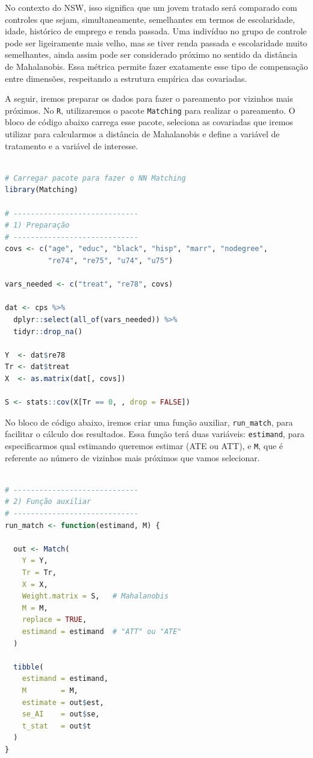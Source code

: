 No contexto do NSW, isso significa que um jovem tratado será comparado com controles que sejam, simultaneamente, semelhantes em termos de escolaridade, idade, histórico de emprego e renda passada. Uma indivíduo no grupo de controle pode ser ligeiramente mais velho, mas se tiver renda passada e escolaridade muito semelhantes, ainda assim pode ser considerado próximo no sentido da distância de Mahalanobis. Essa métrica permite fazer exatamente esse tipo de compensação entre dimensões, respeitando a estrutura empírica das covariadas.

A seguir, iremos preparar os dados para fazer o pareamento por vizinhos mais próximos. No \texttt{R}, utilizaremos o pacote \texttt{Matching} para realizar o pareamento. O bloco de código abaixo carrega esse pacote, seleciona as covariadas que iremos utilizar para calcularmos a distância de Mahalanobis e define a variável de tratamento e a variável de interesse.

\begin{boxH}
\begin{lstlisting}[language = R]

# Carregar pacote para fazer o NN Matching
library(Matching)

# -----------------------------
# 1) Preparação
# -----------------------------
covs <- c("age", "educ", "black", "hisp", "marr", "nodegree",
          "re74", "re75", "u74", "u75")

vars_needed <- c("treat", "re78", covs)

dat <- cps %>%
  dplyr::select(all_of(vars_needed)) %>%
  tidyr::drop_na()

Y  <- dat$re78
Tr <- dat$treat
X  <- as.matrix(dat[, covs])

S <- stats::cov(X[Tr == 0, , drop = FALSE])

\end{lstlisting}
\end{boxH}

No bloco de código abaixo, iremos criar uma função auxiliar, \texttt{run\_match}, para facilitar o cálculo dos resultados. Essa função terá duas variáveis: \texttt{estimand}, para especificarmos qual estimando queremos estimar (ATE ou ATT), e \texttt{M}, que é referente ao número de vizinhos mais próximos que vamos selecionar.

\begin{boxH}
\begin{lstlisting}[language = R]

# -----------------------------
# 2) Função auxiliar
# -----------------------------
run_match <- function(estimand, M) {
  
  out <- Match(
    Y = Y,
    Tr = Tr,
    X = X,
    Weight.matrix = S,   # Mahalanobis
    M = M,
    replace = TRUE,
    estimand = estimand  # "ATT" ou "ATE"
  )
  
  tibble(
    estimand = estimand,
    M        = M,
    estimate = out$est,
    se_AI    = out$se,
    t_stat   = out$t
  )
}

\end{lstlisting}
\end{boxH}

